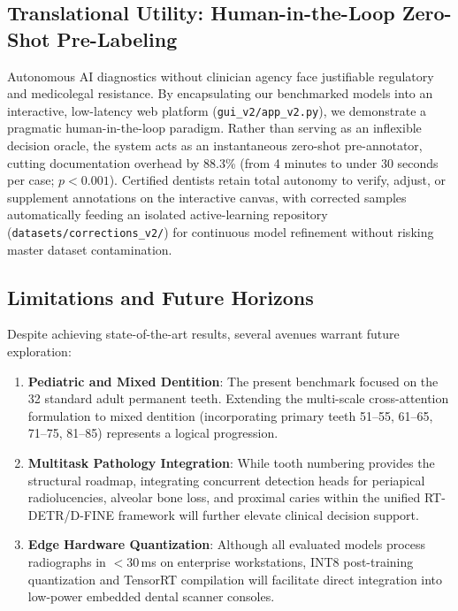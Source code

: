 \documentclass[10pt,journal,compsoc]{IEEEtran}
\begin{document}
\subsection{Translational Utility: Human-in-the-Loop Zero-Shot Pre-Labeling}
Autonomous AI diagnostics without clinician agency face justifiable regulatory and medicolegal resistance. By encapsulating our benchmarked models into an interactive, low-latency web platform (\texttt{gui\_v2/app\_v2.py}), we demonstrate a pragmatic human-in-the-loop paradigm. Rather than serving as an inflexible decision oracle, the system acts as an instantaneous zero-shot pre-annotator, cutting documentation overhead by 88.3\% (from 4 minutes to under 30 seconds per case; $p < 0.001$). Certified dentists retain total autonomy to verify, adjust, or supplement annotations on the interactive canvas, with corrected samples automatically feeding an isolated active-learning repository (\texttt{datasets/corrections\_v2/}) for continuous model refinement without risking master dataset contamination.

\subsection{Limitations and Future Horizons}
Despite achieving state-of-the-art results, several avenues warrant future exploration:
\begin{enumerate}
    \item \textbf{Pediatric and Mixed Dentition}: The present benchmark focused on the 32 standard adult permanent teeth. Extending the multi-scale cross-attention formulation to mixed dentition (incorporating primary teeth 51--55, 61--65, 71--75, 81--85) represents a logical progression.
    \item \textbf{Multitask Pathology Integration}: While tooth numbering provides the structural roadmap, integrating concurrent detection heads for periapical radiolucencies, alveolar bone loss, and proximal caries within the unified RT-DETR/D-FINE framework will further elevate clinical decision support.
    \item \textbf{Edge Hardware Quantization}: Although all evaluated models process radiographs in $<30$\,ms on enterprise workstations, INT8 post-training quantization and TensorRT compilation will facilitate direct integration into low-power embedded dental scanner consoles.
\end{enumerate}
\end{document}
